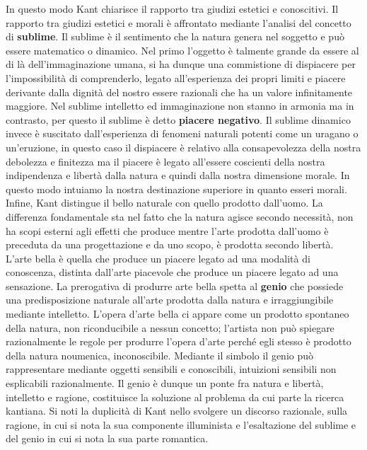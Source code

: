 \documentclass[10pt,a4paper]{article}
\begin{document}
In questo modo Kant chiarisce il rapporto tra giudizi estetici e conoscitivi. Il rapporto tra giudizi estetici e morali è affrontato mediante l'analisi del concetto di \textbf{sublime}. Il sublime è il sentimento che la natura genera nel soggetto e può essere matematico o dinamico. Nel primo l'oggetto è talmente grande da essere al di là dell'immaginazione umana, si ha dunque una commistione di dispiacere per l'impossibilità di comprenderlo, legato all'esperienza dei propri limiti e piacere derivante dalla dignità del nostro essere razionali che ha un valore infinitamente maggiore. Nel sublime intelletto ed immaginazione non stanno in armonia ma in contrasto, per questo il sublime è detto \textbf{piacere negativo}. Il sublime dinamico invece è suscitato dall'esperienza di fenomeni naturali potenti come un uragano o un'eruzione, in questo caso il dispiacere è relativo alla consapevolezza della nostra debolezza e finitezza ma il piacere è legato all'essere coscienti della nostra indipendenza e libertà dalla natura e quindi dalla nostra dimensione morale. In questo modo intuiamo la nostra destinazione superiore in quanto esseri morali.\\
Infine, Kant distingue il bello naturale con quello prodotto dall'uomo. La differenza fondamentale sta nel fatto che la natura agisce secondo necessità, non ha scopi esterni agli effetti che produce mentre l'arte prodotta dall'uomo è preceduta da una progettazione e da uno scopo, è prodotta secondo libertà. L'arte bella è quella che produce un piacere legato ad una modalità di conoscenza, distinta dall'arte piacevole che produce un piacere legato ad una sensazione. La prerogativa di produrre arte bella spetta al \textbf{genio} che possiede una predisposizione naturale all'arte prodotta dalla natura e irraggiungibile mediante intelletto. L'opera d'arte bella ci appare come un prodotto spontaneo della natura, non riconducibile a nessun concetto; l'artista non può spiegare razionalmente le regole per produrre l'opera d'arte perché egli stesso è prodotto della natura noumenica, inconoscibile. Mediante il simbolo il genio può rappresentare mediante oggetti sensibili e conoscibili, intuizioni sensibili non esplicabili razionalmente. Il genio è dunque un ponte fra natura e libertà, intelletto e ragione, costituisce la soluzione al problema da cui parte la ricerca kantiana. Si noti la duplicità di Kant nello svolgere un discorso razionale, sulla ragione, in cui si nota la sua componente illuminista e l'esaltazione del sublime e del genio in cui si nota la sua parte romantica.  
\end{document}

